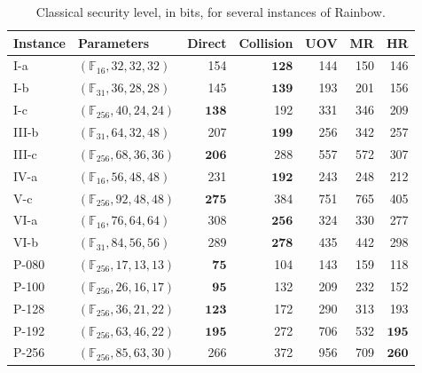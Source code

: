 \documentclass[12pt, a4paper, oneside]{memoir}
\theoremstyle{definition}
\begin{document}
\begin{table}[htbp]
  \renewcommand{\arraystretch}{1.2}
  \setlength{\tabcolsep}{7pt}
  \centering
  \caption{Classical security level, in bits, for several instances of Rainbow.}\label{tab:sec}
  \begin{tabular}{*{2}{l}*{5}{r}}
    \toprule
    Instance & Parameters & Direct & Collision & UOV & MR & HR \\
    \midrule
    I-a    & $(\mathbb{F}_{ 16}, 32, 32, 32)$  &              154 &  $\mathbf{ 128}$ &              144 &              150 &              146 \\
    I-b    & $(\mathbb{F}_{ 31}, 36, 28, 28)$  &              145 &  $\mathbf{ 139}$ &              193 &              201 &              156 \\
    I-c    & $(\mathbb{F}_{256}, 40, 24, 24)$  &  $\mathbf{ 138}$ &              192 &              331 &              346 &              209 \\
    III-b  & $(\mathbb{F}_{ 31}, 64, 32, 48)$  &              207 &  $\mathbf{ 199}$ &              256 &              342 &              257 \\
    III-c  & $(\mathbb{F}_{256}, 68, 36, 36)$  &  $\mathbf{ 206}$ &              288 &              557 &              572 &              307 \\
    IV-a   & $(\mathbb{F}_{ 16}, 56, 48, 48)$  &              231 &  $\mathbf{ 192}$ &              243 &              248 &              212 \\
    V-c    & $(\mathbb{F}_{256}, 92, 48, 48)$  &  $\mathbf{ 275}$ &              384 &              751 &              765 &              405 \\
    VI-a   & $(\mathbb{F}_{ 16}, 76, 64, 64)$  &              308 &  $\mathbf{ 256}$ &              324 &              330 &              277 \\
    VI-b   & $(\mathbb{F}_{ 31}, 84, 56, 56)$  &              289 &  $\mathbf{ 278}$ &              435 &              442 &              298 \\
    P-080  & $(\mathbb{F}_{256}, 17, 13, 13)$  &  $\mathbf{  75}$ &              104 &              143 &              159 &              118 \\
    P-100  & $(\mathbb{F}_{256}, 26, 16, 17)$  &  $\mathbf{  95}$ &              132 &              209 &              232 &              152 \\
    P-128  & $(\mathbb{F}_{256}, 36, 21, 22)$  &  $\mathbf{ 123}$ &              172 &              290 &              313 &              193 \\
    P-192  & $(\mathbb{F}_{256}, 63, 46, 22)$  &  $\mathbf{ 195}$ &              272 &              706 &              532 &  $\mathbf{ 195}$ \\
    P-256  & $(\mathbb{F}_{256}, 85, 63, 30)$  &              266 &              372 &              956 &              709 &  $\mathbf{ 260}$ \\
    \bottomrule
  \end{tabular}
\end{table}
\end{document}
